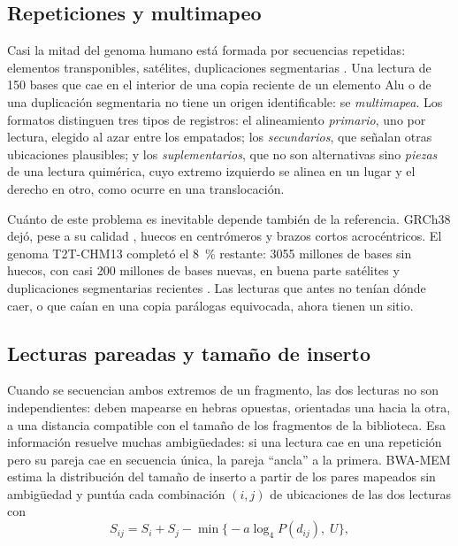 \subsection{Repeticiones y multimapeo}

Casi la mitad del genoma humano está formada por secuencias repetidas: elementos transponibles, satélites, duplicaciones segmentarias \parencite{c07-treangen2012}. Una lectura de 150 bases que cae en el interior de una copia reciente de un elemento Alu o de una duplicación segmentaria no tiene un origen identificable: se \emph{multimapea}. Los formatos distinguen tres tipos de registros: el alineamiento \emph{primario}, uno por lectura, elegido al azar entre los empatados; los \emph{secundarios}, que señalan otras ubicaciones plausibles; y los \emph{suplementarios}, que no son alternativas sino \emph{piezas} de una lectura quimérica, cuyo extremo izquierdo se alinea en un lugar y el derecho en otro, como ocurre en una translocación.

Cuánto de este problema es inevitable depende también de la referencia. GRCh38 dejó, pese a su calidad \parencite{c07-schneider2017}, huecos en centrómeros y brazos cortos acrocéntricos. El genoma T2T-CHM13 completó el 8~\% restante: \num{3055} millones de bases sin huecos, con casi 200 millones de bases nuevas, en buena parte satélites y duplicaciones segmentarias recientes \parencite{c07-nurk2022}. Las lecturas que antes no tenían dónde caer, o que caían en una copia parálogas equivocada, ahora tienen un sitio.

\subsection{Lecturas pareadas y tamaño de inserto}

Cuando se secuencian ambos extremos de un fragmento, las dos lecturas no son independientes: deben mapearse en hebras opuestas, orientadas una hacia la otra, a una distancia compatible con el tamaño de los fragmentos de la biblioteca. Esa información resuelve muchas ambigüedades: si una lectura cae en una repetición pero su pareja cae en secuencia única, la pareja ``ancla'' a la primera. BWA-MEM estima la distribución del tamaño de inserto a partir de los pares mapeados sin ambigüedad y puntúa cada combinación $(i,j)$ de ubicaciones de las dos lecturas con \parencite{c07-li2013}
\begin{equation}\label{eq:07-pares}
S_{ij} = S_i + S_j - \min\big\{-a\log_4 P(d_{ij}),\; U\big\},
\end{equation}

